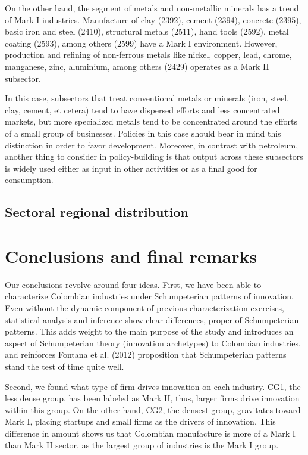 \documentclass[12pt,a4paper]{article}
\begin{document}
On the other hand, the segment of metals and non-metallic minerals has a trend of Mark I industries. Manufacture of clay (2392), cement (2394), concrete (2395), basic iron and steel (2410), structural metals (2511), hand tools (2592), metal coating (2593), among others (2599) have a Mark I environment. However, production and refining of non-ferrous metals like nickel, copper, lead, chrome, manganese, zinc, aluminium, among others (2429) operates as a Mark II subsector. 

In this case, subsectors that treat conventional metals or minerals (iron, steel, clay, cement, et cetera) tend to have dispersed efforts and less concentrated markets, but more specialized metals tend to be concentrated around the efforts of a small group of businesses. Policies in this case should bear in mind this distinction in order to favor development. Moreover, in contrast with petroleum, another thing to consider in policy-building is that output across these subsectors is widely used either as input in other activities or as a final good for consumption.    

\subsection{Sectoral regional distribution}

\section{Conclusions and final remarks}

Our conclusions revolve around four ideas. First, we have been able to characterize Colombian industries under Schumpeterian patterns of innovation. Even without the dynamic component of previous characterization exercises, statistical analysis and inference show clear differences, proper of Schumpeterian patterns. This adds weight to the main purpose of the study and introduces an aspect of Schumpeterian theory (innovation archetypes) to Colombian industries, and reinforces Fontana et al. (2012) proposition that Schumpeterian patterns stand the test of time quite well.

Second, we found what type of firm drives innovation on each industry. CG1, the less dense group, has been labeled as Mark II, thus, larger firms drive innovation within this group. On the other hand, CG2, the densest group, gravitates toward Mark I, placing startups and small firms as the drivers of innovation. This difference in amount shows us that Colombian manufacture is more of a Mark I than Mark II sector, as the largest group of industries is the Mark I group.  
\end{document}
